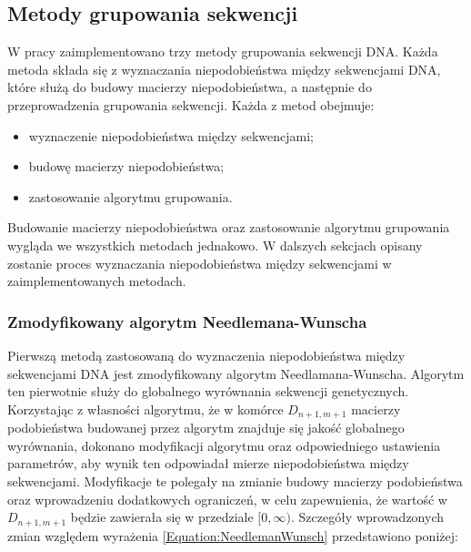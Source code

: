    \subsection{Metody grupowania sekwencji}

        W pracy zaimplementowano trzy metody grupowania sekwencji DNA. Każda metoda składa się z wyznaczania niepodobieństwa między sekwencjami DNA, które służą do budowy macierzy niepodobieństwa, a następnie do przeprowadzenia grupowania sekwencji. Każda z metod obejmuje:

        \begin{itemize}
            \item {
                wyznaczenie niepodobieństwa między sekwencjami;
            }
            \item {
                budowę macierzy niepodobieństwa;
            }
            \item {
                zastosowanie algorytmu grupowania.
            }
        \end{itemize}

        Budowanie macierzy niepodobieństwa oraz zastosowanie algorytmu grupowania wygląda we wszystkich metodach jednakowo. W dalszych sekcjach opisany zostanie proces wyznaczania niepodobieństwa między sekwencjami w zaimplementowanych metodach.

        \subsubsection{Zmodyfikowany algorytm Needlemana-Wunscha}\label{Method:NeedlemanWunsch}

            Pierwszą metodą zastosowaną do wyznaczenia niepodobieństwa między sekwencjami DNA jest  zmodyfikowany algorytm Needlamana-Wunscha. Algorytm ten pierwotnie służy do globalnego wyrównania sekwencji genetycznych. Korzystając z własności algorytmu, że w komórce $D_{n+1, m+1}$ macierzy podobieństwa budowanej przez algorytm znajduje się jakość globalnego wyrównania, dokonano modyfikacji algorytmu oraz odpowiedniego ustawienia parametrów, aby wynik ten odpowiadał mierze niepodobieństwa między sekwencjami. Modyfikacje te polegały na zmianie budowy macierzy podobieństwa oraz wprowadzeniu dodatkowych ograniczeń, w celu zapewnienia, że wartość w $D_{n+1, m+1}$ będzie zawierała się w przedziale $[0, \infty)$. Szczegóły wprowadzonych zmian względem wyrażenia \eqref{Equation:NeedlemanWunsch} przedstawiono poniżej:

